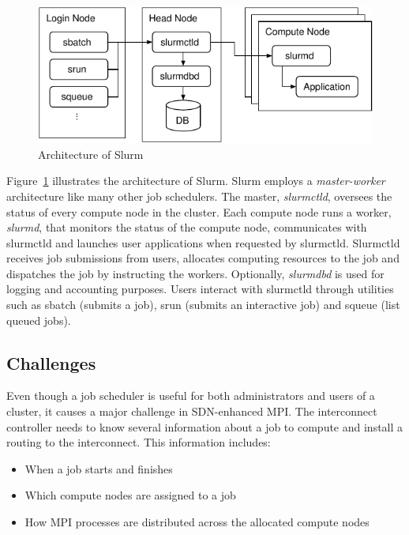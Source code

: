 \documentclass[graybox]{svmult}
\begin{document}
\begin{figure}
    \centering
    \includegraphics{slurm}
    \caption{Architecture of Slurm}%
    \label{kt:fig:slurm}
\end{figure}

Figure~\ref{kt:fig:slurm} illustrates the architecture of Slurm. Slurm employs
a \textit{master-worker} architecture like many other job schedulers. The
master, \textit{slurmctld}, oversees the status of every compute node in the
cluster. Each compute node runs a worker, \textit{slurmd}, that monitors the
status of the compute node, communicates with slurmctld and launches user
applications when requested by slurmctld. Slurmctld receives job submissions
from users, allocates computing resources to the job and dispatches the job by
instructing the workers. Optionally, \textit{slurmdbd} is used for logging and
accounting purposes. Users interact with slurmctld through utilities such as
sbatch (submits a job), srun (submits an interactive job) and squeue (list
queued jobs).

\subsection{Challenges}

Even though a job scheduler is useful for both administrators and users of a
cluster, it causes a major challenge in SDN-enhanced MPI\@. The interconnect
controller needs to know several information about a job to compute and
install a routing to the interconnect. This information includes:

\begin{itemize}
    \item When a job starts and finishes
    \item Which compute nodes are assigned to a job
    \item How MPI processes are distributed across the allocated compute nodes
\end{itemize}
\end{document}
